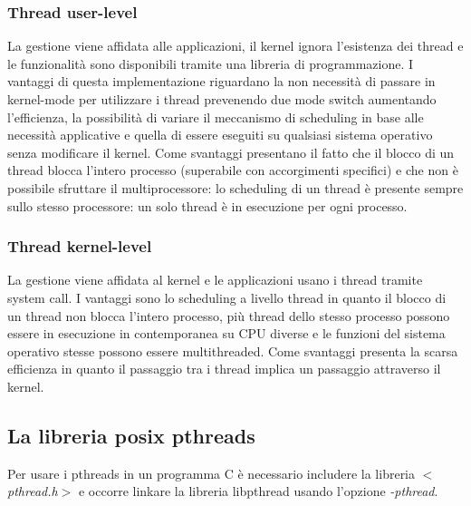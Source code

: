 \subsubsection{Thread user-level}
La gestione viene affidata alle applicazioni, il kernel ignora l'esistenza dei thread e le funzionalit\`a sono disponibili tramite una libreria di programmazione. I vantaggi di questa 
implementazione riguardano la non necessit\`a di passare in kernel-mode per utilizzare i thread prevenendo due mode switch aumentando l'efficienza, la possibilità di variare il meccanismo di scheduling in base alle necessit\`a applicative e quella di essere eseguiti su qualsiasi sistema operativo senza modificare il kernel. Come svantaggi presentano il fatto che il blocco di 
un thread blocca l'intero processo (superabile con accorgimenti specifici) e che non \`e possibile sfruttare il multiprocessore: lo scheduling di un thread \`e presente sempre sullo stesso
processore: un solo thread \`e in esecuzione per ogni processo.
\subsubsection{Thread kernel-level}
La gestione viene affidata al kernel e le applicazioni usano i thread tramite system call. I vantaggi sono lo scheduling a livello thread in quanto il blocco di un thread non blocca
l'intero processo, pi\`u thread dello stesso processo possono essere in esecuzione in contemporanea su CPU diverse e le funzioni del sistema operativo stesse possono essere  
multithreaded. Come svantaggi presenta la scarsa efficienza in quanto il passaggio tra i thread implica un passaggio attraverso il kernel.
\subsection{La libreria posix pthreads}
Per usare i pthreads in un programma C \`e necessario includere la libreria \emph{$<$pthread.h$>$} e occorre linkare la libreria libpthread usando l'opzione \emph{-pthread}. 
